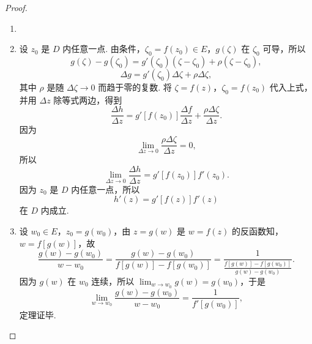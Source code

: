 \documentclass[../../main.tex]{subfiles}
\begin{document}
\begin{proof}
\begin{enumerate}[(1)]
\item 

\item 设 \( z_0 \) 是 \( D \) 内任意一点. 由条件，\( \zeta_0 = f(z_0) \in E \)，\( g(\zeta) \) 在 \( \zeta_0 \) 可导，所以
\[
g(\zeta) - g(\zeta_0) = g'(\zeta_0)(\zeta - \zeta_0) + \rho(\zeta - \zeta_0),
\]
\[
\Delta g = g'(\zeta_0)\Delta \zeta + \rho \Delta \zeta,
\]
其中 \( \rho \) 是随 \( \Delta \zeta \to 0 \) 而趋于零的复数. 将 \( \zeta = f(z) \)，\( \zeta_0 = f(z_0) \) 代入上式，并用 \( \Delta z \) 除等式两边，得到
\[
\frac{\Delta h}{\Delta z} = g'[f(z_0)] \frac{\Delta f}{\Delta z} + \frac{\rho \Delta \zeta}{\Delta z}.
\]
因为
\[
\lim_{\Delta z \to 0} \frac{\rho \Delta \zeta}{\Delta z} = 0,
\]
所以
\[
\lim_{\Delta z \to 0} \frac{\Delta h}{\Delta z} = g'[f(z_0)]f'(z_0).
\]
因为 \( z_0 \) 是 \( D \) 内任意一点，所以
\[
h'(z) = g'[f(z)]f'(z)
\]
在 \( D \) 内成立.

\item 设 \( w_0 \in E \)，\( z_0 = g(w_0) \)，由 \( z = g(w) \) 是 \( w = f(z) \) 的反函数知，\( w = f[g(w)] \)，故
\[
\frac{g(w) - g(w_0)}{w - w_0} = \frac{g(w) - g(w_0)}{f[g(w)] - f[g(w_0)]} = \frac{1}{\frac{f[g(w)] - f[g(w_0)]}{g(w) - g(w_0)}}.
\]
因为 \( g(w) \) 在 \( w_0 \) 连续，所以 \( \lim_{w \to w_0} g(w) = g(w_0) \)，于是
\[
\lim_{w \to w_0} \frac{g(w) - g(w_0)}{w - w_0} = \frac{1}{f'[g(w_0)]},
\]
定理证毕.
\end{enumerate}

\end{proof}
\end{document}
